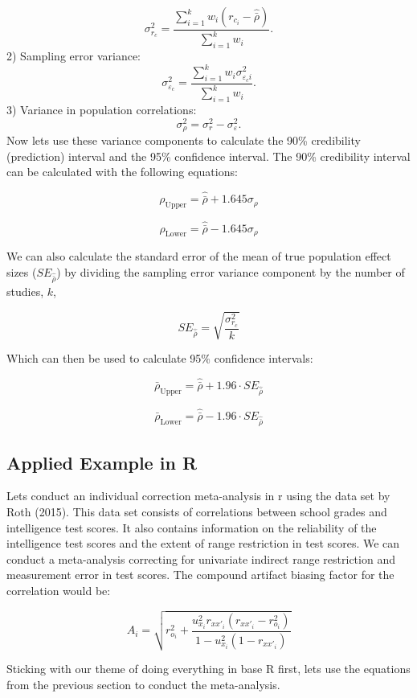 \documentclass[
  letterpaper,
  DIV=11,
  numbers=noendperiod]{scrreprt}
\begin{document}
\[
\sigma^2_{r_c}=\frac{\sum^k_{i=1}w_i(r_{c_i} - \hat{\bar{\rho}})}{\sum^k_{i=1}w_i}.
\] 2) Sampling error variance: \[
\sigma^2_{\varepsilon_c} = \frac{\sum^k_{i=1}w_i\sigma^2_{\varepsilon_ci}}{\sum^k_{i=1}w_i}.
\] 3) Variance in population correlations: \[
\sigma^2_\rho = \sigma^2_r - \sigma^2_{\varepsilon}.
\] Now lets use these variance components to calculate the 90\%
credibility (prediction) interval and the 95\% confidence interval. The
90\% credibility interval can be calculated with the following
equations:

\[
\rho_\text{Upper} = \hat{\bar{\rho}} + 1.645\sigma_\rho
\]

\[
\rho_\text{Lower} = \hat{\bar{\rho}} - 1.645\sigma_\rho
\]

We can also calculate the standard error of the mean of true population
effect sizes (\(SE_{\hat{\bar{\rho}}}\)) by dividing the sampling error
variance component by the number of studies, \(k\),

\[
SE_{\hat{\bar{\rho}}} = \sqrt{\frac{\sigma^2_{r_c}}{k}}
\]

Which can then be used to calculate 95\% confidence intervals:

\[
\bar{\rho}_\text{Upper} = \hat{\bar{\rho}} + 1.96\cdot SE_{\hat{\bar{\rho}}}
\]

\[
\bar{\rho}_\text{Lower} = \hat{\bar{\rho}} - 1.96\cdot SE_{\hat{\bar{\rho}}}
\]

\hypertarget{applied-example-in-r-16}{%
\subsection{Applied Example in R}\label{applied-example-in-r-16}}

Lets conduct an individual correction meta-analysis in r using the data
set by Roth (2015). This data set consists of correlations between
school grades and intelligence test scores. It also contains information
on the reliability of the intelligence test scores and the extent of
range restriction in test scores. We can conduct a meta-analysis
correcting for univariate indirect range restriction and measurement
error in test scores. The compound artifact biasing factor for the
correlation would be:

\[
A_i=\sqrt{r_{o_i}^2 + \frac{u_{x_i}^2 r_{xx'_i}(r_{xx'_i} - r_{o_i}^2) }{1 - u_{x_i}^2 (1-r_{xx'_i})} }
\]

Sticking with our theme of doing everything in base R first, lets use
the equations from the previous section to conduct the meta-analysis.
\end{document}
